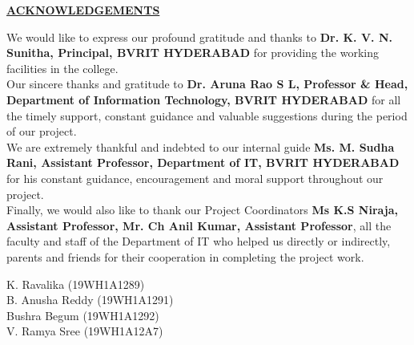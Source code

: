 \documentclass[a4paper,12pt, English]{article}
\newcommand\tab[1][1cm]{\hspace*{#1}}
\begin{document}
\begin{titlepage}
\begin{center}
    \textbf{\normalsize \underline{ACKNOWLEDGEMENTS}}\\
\end{center}
\vspace*{0.2in}
\begin{normalsize}
We would like to express our profound gratitude and thanks to \textbf{Dr. K. V. N. Sunitha, Principal, BVRIT HYDERABAD} for providing the working facilities in the college.\\
\newline
Our sincere thanks and gratitude to \textbf{Dr. Aruna Rao S L, Professor \& Head, Department of Information Technology, BVRIT HYDERABAD} for all the timely support, constant guidance and valuable suggestions during the period of our project.\\
\newline
We are extremely thankful and indebted to our internal guide \textbf{Ms. M. Sudha Rani, Assistant Professor, Department of IT, BVRIT HYDERABAD} for his constant guidance, encouragement and moral support throughout our project.\\
\newline
Finally, we would also like to thank our Project Coordinators {\textbf{Ms K.S Niraja, Assistant Professor, Mr. Ch Anil Kumar, Assistant Professor}}, all the faculty and staff of the Department of IT who helped us directly or indirectly, parents and friends for their cooperation in completing the project work.
\end{normalsize}
\newline
\newline
\newline
\newline
\tab\tab\tab\tab \hspace*{6.0cm}
 {{K. Ravalika  (19WH1A1289)\\
 \newline
\newline
 \tab\tab\tab\tab \hspace*{6.0cm}
 B. Anusha Reddy (19WH1A1291) \\
 \newline
\newline
\tab\tab\tab\tab \hspace*{6.0cm}
 Bushra Begum (19WH1A1292) \\
 \newline
\newline
\tab\tab\tab\tab \hspace*{5.96cm}
 V. Ramya Sree (19WH1A12A7) }} \\
 
\end{titlepage}
\end{document}
